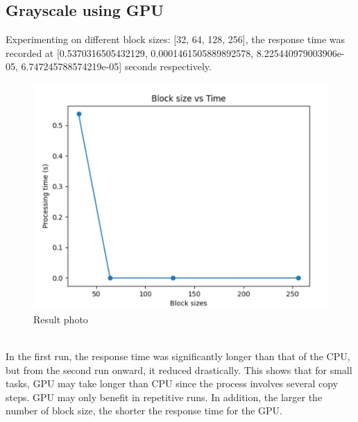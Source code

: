 \documentclass{article}
\begin{document}
\subsection{Grayscale using GPU}
Experimenting on different block sizes: [32, 64, 128, 256], the response time was recorded at [0.5370316505432129, 0.0001461505889892578, 8.225440979003906e-05, 6.747245788574219e-05] seconds respectively.
\begin{figure}[htbp]
    \centering
    \includegraphics[width=1\linewidth]{GPU response time.png}
    \caption{Result photo}
    \label{fig:placeholder}
\end{figure}
\\In the first run, the response time was significantly longer than that of the CPU, but from the second run onward, it reduced drastically. This shows that for small tasks, GPU may take longer than CPU since the process involves several copy steps. GPU may only benefit in repetitive runs. In addition, the larger the number of block size, the shorter the response time for the GPU. 
\end{document}
